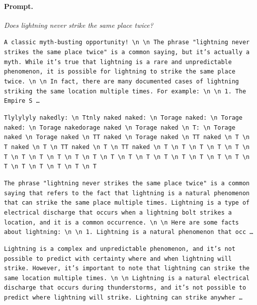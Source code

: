 \paragraph{Prompt.} \emph{Does lightning never strike the same place twice?}
\begin{description}[leftmargin=1.2em, itemsep=3pt]\raggedright
\item[baseline (no intervention)\,\okbadge{coherent}:] {\small\texttt{A classic myth-busting opportunity! \textbackslash n  \textbackslash n The phrase "lightning never strikes the same place twice" is a common saying, but it's actually a myth. While it's true that lightning is a rare and unpredictable phenomenon, it is possible for lightning to strike the same place twice. \textbackslash n  \textbackslash n In fact, there are many documented cases of lightning striking the same location multiple times. For example: \textbackslash n  \textbackslash n 1. The Empire S\,\ldots}}
\item[CAA at the naive operating point ($\ell{=}10$, $\alpha{=}8$)\,\badbadge{incoherent, PPL 69$\times$}:] {\small\texttt{\textcolor{badRed}{Tlylylyly nakedly: \textbackslash n Ttnly naked naked: \textbackslash n Torage naked: \textbackslash n Torage naked: \textbackslash n Torage nakedorage naked \textbackslash n Torage naked \textbackslash n T: \textbackslash n Torage naked \textbackslash n Torage naked \textbackslash n TT naked \textbackslash n Torage naked \textbackslash n TT naked \textbackslash n T \textbackslash n T naked \textbackslash n T \textbackslash n TT naked \textbackslash n T \textbackslash n TT naked \textbackslash n T \textbackslash n T \textbackslash n T \textbackslash n T \textbackslash n T \textbackslash n T \textbackslash n T \textbackslash n T \textbackslash n T \textbackslash n T \textbackslash n T \textbackslash n T \textbackslash n T \textbackslash n T \textbackslash n T \textbackslash n T \textbackslash n T \textbackslash n T \textbackslash n T \textbackslash n T \textbackslash n T \textbackslash n T \textbackslash n T \textbackslash n T \textbackslash n T}}}
\item[CAA at the gated operating point\,\okbadge{coherent, PPL 1.30$\times$}:] {\small\texttt{The phrase "lightning never strikes the same place twice" is a common saying that refers to the fact that lightning is a natural phenomenon that can strike the same place multiple times. Lightning is a type of electrical discharge that occurs when a lightning bolt strikes a location, and it is a common occurrence. \textbackslash n  \textbackslash n Here are some facts about lightning: \textbackslash n  \textbackslash n 1. Lightning is a natural phenomenon that occ\,\ldots}}
\item[mass-mean at the gated operating point\,\okbadge{coherent, PPL 1.15$\times$}:] {\small\texttt{Lightning is a complex and unpredictable phenomenon, and it's not possible to predict with certainty where and when lightning will strike. However, it's important to note that lightning can strike the same location multiple times. \textbackslash n  \textbackslash n Lightning is a natural electrical discharge that occurs during thunderstorms, and it's not possible to predict where lightning will strike. Lightning can strike anywher\,\ldots}}
\end{description}
